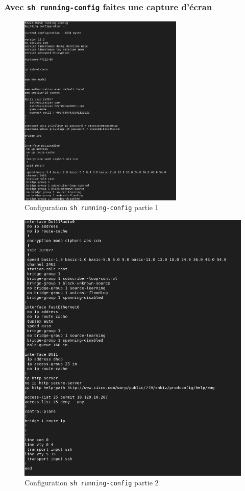 \documentclass[12pt, a4paper]{article}
\begin{document}
        \subsubsection{Avec \texttt{sh running-config} faites une capture d'écran}
        \begin{figure}[H]
            \centering
            \includegraphics[width=0.7\textwidth]{img/configg-part1.png}
            \caption{Configuration \texttt{sh running-config} partie 1}
            \label{fig:configg1}
        \end{figure}
        \begin{figure}[H]
            \centering
            \includegraphics[width=1\textwidth]{img/configg-part2.png}
            \caption{Configuration \texttt{sh running-config} partie 2}
            \label{fig:configg2}
        \end{figure}
\end{document}
